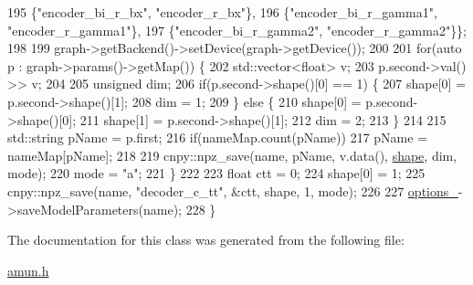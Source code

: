 \begin{DoxyCode}
195            \{\textcolor{stringliteral}{"encoder\_bi\_r\_bx"}, \textcolor{stringliteral}{"encoder\_r\_bx"}\},
196            \{\textcolor{stringliteral}{"encoder\_bi\_r\_gamma1"}, \textcolor{stringliteral}{"encoder\_r\_gamma1"}\},
197            \{\textcolor{stringliteral}{"encoder\_bi\_r\_gamma2"}, \textcolor{stringliteral}{"encoder\_r\_gamma2"}\}\};
198 
199     graph->getBackend()->setDevice(graph->getDevice());
200 
201     \textcolor{keywordflow}{for}(\textcolor{keyword}{auto} p : graph->params()->getMap()) \{
202       std::vector<float> v;
203       p.second->val() >> v;
204 
205       \textcolor{keywordtype}{unsigned} dim;
206       \textcolor{keywordflow}{if}(p.second->shape()[0] == 1) \{
207         shape[0] = p.second->shape()[1];
208         dim = 1;
209       \} \textcolor{keywordflow}{else} \{
210         shape[0] = p.second->shape()[0];
211         shape[1] = p.second->shape()[1];
212         dim = 2;
213       \}
214 
215       std::string pName = p.first;
216       \textcolor{keywordflow}{if}(nameMap.count(pName))
217         pName = nameMap[pName];
218 
219       cnpy::npz\_save(name, pName, v.data(), \hyperlink{namespacemarian_1_1keywords_a5933d683efd12b59e17a7131fa64cf1c}{shape}, dim, mode);
220       mode = \textcolor{stringliteral}{"a"};
221     \}
222 
223     \textcolor{keywordtype}{float} ctt = 0;
224     shape[0] = 1;
225     cnpy::npz\_save(name, \textcolor{stringliteral}{"decoder\_c\_tt"}, &ctt, shape, 1, mode);
226 
227     \hyperlink{classmarian_1_1EncoderDecoder_a467e7d547bd7888d1bea248e99cef212}{options\_}->saveModelParameters(name);
228   \}
\end{DoxyCode}


The documentation for this class was generated from the following file\+:\begin{DoxyCompactItemize}
\item 
\hyperlink{amun_8h}{amun.\+h}\end{DoxyCompactItemize}
